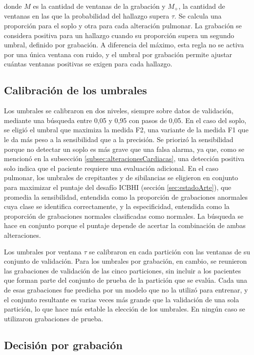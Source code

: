 \noindent donde $M$ es la cantidad de ventanas de la grabación y $M_{+}$, la cantidad de ventanas
en las que la probabilidad del hallazgo supera $\tau$. Se calcula una proporción para el soplo y
otra para cada alteración pulmonar. La grabación se considera positiva para un hallazgo cuando su
proporción supera un segundo umbral, definido por grabación. A diferencia del máximo, esta regla no
se activa por una única ventana con ruido, y el umbral por grabación permite ajustar cuántas
ventanas positivas se exigen para cada hallazgo.

\subsection{Calibración de los umbrales}
\label{subsec:calibracion}

Los umbrales se calibraron en dos niveles, siempre sobre datos de validación, mediante una búsqueda
entre 0,05 y 0,95 con pasos de 0,05. En el caso del soplo, se eligió el umbral que maximiza la
medida F2, una variante de la medida F1 que le da más peso a la sensibilidad que a la precisión.
Se priorizó la sensibilidad porque no detectar un soplo es más grave que una falsa alarma, ya que,
como se mencionó en la subsección \ref{subsec:alteracionesCardiacas}, una detección positiva solo
indica que el paciente requiere una evaluación adicional. En el caso pulmonar, los umbrales de
crepitantes y de sibilancias se eligieron en conjunto para maximizar el puntaje del desafío ICBHI
(sección \ref{sec:estadoArte}), que promedia la sensibilidad, entendida como la proporción de
grabaciones anormales cuya clase se identifica correctamente, y la especificidad, entendida como la
proporción de grabaciones normales clasificadas como normales. La búsqueda se hace en conjunto
porque el puntaje depende de acertar la combinación de ambas alteraciones.

Los umbrales por ventana $\tau$ se calibraron en cada partición con las ventanas de su conjunto de
validación. Para los umbrales por grabación, en cambio, se reunieron las grabaciones de validación
de las cinco particiones, sin incluir a los pacientes que forman parte del conjunto de prueba de la
partición que se evalúa. Cada una de esas grabaciones fue predicha por un modelo que no la utilizó
para entrenar, y el conjunto resultante es varias veces más grande que la validación de una sola
partición, lo que hace más estable la elección de los umbrales. En ningún caso se utilizaron
grabaciones de prueba.

\subsection{Decisión por grabación}
\label{subsec:decision}

